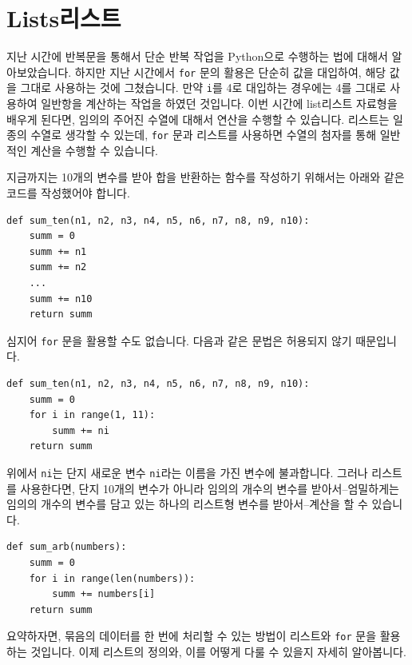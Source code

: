 \documentclass[../main.tex]{subfiles}
\begin{document}
\section{Lists리스트}
지난 시간에 반복문을 통해서 단순 반복 작업을 Python으로 수행하는 법에 대해서 알아보았습니다.
하지만 지난 시간에서 \texttt{for} 문의 활용은 단순히 값을 대입하여, 해당 값을 그대로 사용하는 것에 그쳤습니다.
만약 \texttt{i}를 4로 대입하는 경우에는 4를 그대로 사용하여 일반항을 계산하는 작업을 하였던 것입니다.
이번 시간에 list리스트 자료형을 배우게 된다면, 임의의 주어진 수열에 대해서 연산을 수행할 수 있습니다.
리스트는 일종의 수열로 생각할 수 있는데, \texttt{for} 문과 리스트를 사용하면 수열의 첨자를 통해 일반적인 계산을 수행할 수 있습니다.

지금까지는 10개의 변수를 받아 합을 반환하는 함수를 작성하기 위해서는 아래와 같은 코드를 작성했어야 합니다.
\begin{verbatim}
def sum_ten(n1, n2, n3, n4, n5, n6, n7, n8, n9, n10):
    summ = 0
    summ += n1
    summ += n2
    ...
    summ += n10
    return summ
\end{verbatim}
심지어 \texttt{for} 문을 활용할 수도 없습니다.
다음과 같은 문법은 허용되지 않기 때문입니다.
\begin{verbatim}
def sum_ten(n1, n2, n3, n4, n5, n6, n7, n8, n9, n10):
    summ = 0
    for i in range(1, 11):
        summ += ni
    return summ
\end{verbatim}
위에서 \texttt{ni}는 단지 새로운 변수 \texttt{ni}라는 이름을 가진 변수에 불과합니다.
그러나 리스트를 사용한다면, 단지 10개의 변수가 아니라 임의의 개수의 변수를 받아서--엄밀하게는 임의의 개수의 변수를 담고 있는 하나의 리스트형 변수를 받아서--계산을 할 수 있습니다.
\begin{verbatim}
def sum_arb(numbers):
    summ = 0
    for i in range(len(numbers)):
        summ += numbers[i]
    return summ
\end{verbatim}

요약하자면, 묶음의 데이터를 한 번에 처리할 수 있는 방법이 리스트와 \texttt{for} 문을 활용하는 것입니다.
이제 리스트의 정의와, 이를 어떻게 다룰 수 있을지 자세히 알아봅니다.
\end{document}
